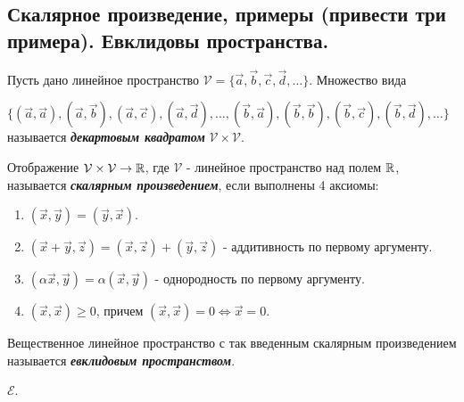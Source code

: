 \subsection{
    Скалярное произведение, примеры (привести три примера). Евклидовы пространства.
}

\begin{definition}
    Пусть дано линейное пространство $\mathcal{V} = \{\vec{a}, \vec{b}, \vec{c}, \vec{d}, \dots\}$. Множество вида 
    
    $\{(\vec{a}, \vec{a}), (\vec{a}, \vec{b}), (\vec{a}, \vec{c}), (\vec{a}, \vec{d}), \dots, (\vec{b}, \vec{a}), (\vec{b}, \vec{b}), (\vec{b}, \vec{c}), (\vec{b}, \vec{d}), \dots\}$ называется \textbf{\textit{декартовым квадратом}} $\mathcal{V} \times \mathcal{V}$.
\end{definition}

\begin{definition}
    Отображение $\mathcal{V} \times \mathcal{V} \to \mathbb{R}$, где $\mathcal{V}$ - линейное пространство над полем $\mathbb{R}$, называется \textbf{\textit{скалярным произведением}}, если выполнены 4 аксиомы:
    \begin{enumerate}[nosep]
        \item $(\vec{x}, \vec{y}) = (\vec{y}, \vec{x})$.
        \item $(\vec{x} + \vec{y}, \vec{z}) = (\vec{x}, \vec{z}) + (\vec{y}, \vec{z})$ - аддитивность по первому аргументу.
        \item $(\alpha \vec{x}, \vec{y}) = \alpha(\vec{x}, \vec{y})$ - однородность по первому аргументу.
        \item $(\vec{x}, \vec{x}) \geq 0$, причем $(\vec{x}, \vec{x}) = 0 \iff \vec{x} = 0$.
    \end{enumerate}
\end{definition}

\begin{definition}
    Вещественное линейное пространство с так введенным скалярным произведением называется \textbf{\textit{евклидовым пространством}}.
\end{definition}

\begin{designation}
    $\mathcal{E}$.
\end{designation}

